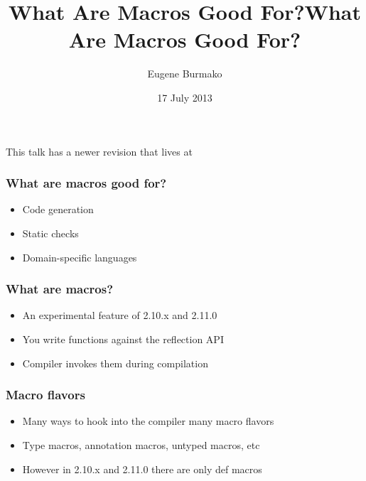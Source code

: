 \documentclass[svgnames,hyperref={bookmarks=false}]{beamer}
\title{What Are Macros Good For?}
\begin{document}
\title{What Are Macros Good For?}
\author{Eugene Burmako}
\date{17 July 2013}

{
\begin{frame}
  \titlepage
  This talk has a newer revision that lives at 
\end{frame}
}

\begin{frame}[fragile]
\frametitle{What are macros good for?}

\begin{itemize}
\item Code generation
\item Static checks
\item Domain-specific languages
\end{itemize}
\end{frame}

\begin{frame}[fragile]
\frametitle{}

\vskip40pt
\begin{center}
\end{center}
\end{frame}

\begin{frame}[fragile]
\frametitle{What are macros?}

\begin{itemize}
\item An experimental feature of 2.10.x and 2.11.0
\item You write functions against the reflection API
\item Compiler invokes them during compilation
\end{itemize}
\end{frame}

\begin{frame}[fragile]
\frametitle{Macro flavors}

\begin{itemize}
\item Many ways to hook into the compiler \text{\textrightarrow} many macro flavors
\item Type macros, annotation macros, untyped macros, etc
\item However in 2.10.x and 2.11.0 there are only def macros
\end{itemize}
\end{frame}
\end{document}
